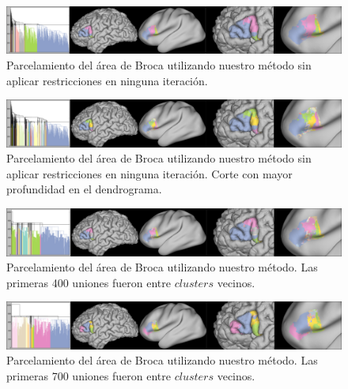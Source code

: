 \begin{figure}[h!]
    \includegraphics[width=\textwidth]{img/broca/logit_0.png}
    \caption{Parcelamiento del \'area de Broca utilizando nuestro m\'etodo 
             sin aplicar restricciones en ninguna iteraci\'on.}
    \label{fig:nuestro0}
\end{figure}
                                                                                                                        
\begin{figure}[h!]
    \includegraphics[width=\textwidth]{img/broca/logit_0_deep.png}
    \caption{Parcelamiento del \'area de Broca utilizando nuestro m\'etodo
             sin aplicar restricciones en ninguna iteraci\'on. Corte con
             mayor profundidad en el dendrograma.}
    \label{fig:nuestro1}
\end{figure}

\begin{figure}[h!]
    \includegraphics[width=\textwidth]{img/broca/logit_400.png}
    \caption{Parcelamiento del \'area de Broca utilizando nuestro m\'etodo.
             Las primeras 400 uniones fueron entre $clusters$
             vecinos.}    
    \label{fig:nuestro2}
\end{figure}

\begin{figure}[h!]
    \includegraphics[width=\textwidth]{img/broca/logit_750.png}
    \caption{Parcelamiento del \'area de Broca utilizando nuestro m\'etodo.
             Las primeras 700 uniones fueron entre $clusters$
             vecinos.}       
    \label{fig:nuestro3}
\end{figure}

